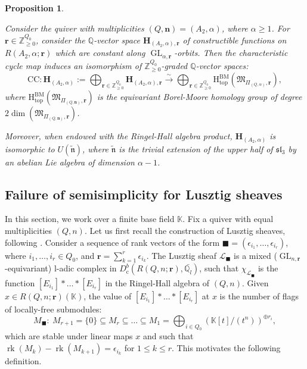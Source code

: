 \documentclass[11pt,english]{article}
\numberwithin{equation}{section}
\numberwithin{figure}{section}
\theoremstyle{definition}
\theoremstyle{plain}
\newtheorem{prop}[df]{Proposition}
\theoremstyle{remark}
\DeclareMathOperator{\GL}{GL}
\DeclareMathOperator{\rk}{rk}
\newcommand\nn{\mathbf{n}}
\newcommand\rr{\mathbf{r}}
\newcommand\HH{\mathrm{H}}
\newcommand\ZZ{\mathbb{Z}}
\newcommand\QQ{\mathbb{Q}}
\newcommand\KK{\mathbb{K}}
\begin{document}
\begin{prop} \label{Prop/Ch5TopCoHA}

Consider the quiver with multiplicities $(Q,\nn)=(A_{2},\alpha)$,
where $\alpha\geq1$. For $\rr\in\ZZ_{\geq0}^{Q_{0}}$, consider the
$\QQ$-vector space $\mathbf{H}_{(A_{2},\alpha),\rr}$ of constructible
functions on $R(A_{2},\alpha;\rr)$ which are constant along $\GL_{\alpha,\rr}$-orbits.
Then the characteristic cycle map induces an isomorphism of $\ZZ_{\geq0}^{Q_{0}}$-graded
$\QQ$-vector spaces:\[
\mathrm{CC}:
\mathbf{H}_{(A_2,\alpha)}:=\bigoplus_{\rr\in\ZZ_{\geq0}^{Q_0}}\mathbf{H}_{(A_2,\alpha),\rr}
\overset{\sim}{\longrightarrow}
\bigoplus_{\rr\in\ZZ_{\geq0}^{Q_0}}\HH_{\mathrm{top}}^{\mathrm{BM}}\left(\mathfrak{M}_{\Pi_{(Q,\alpha)},\rr}\right)
,
\]where $\HH_{\mathrm{top}}^{\mathrm{BM}}\left(\mathfrak{M}_{\Pi_{(Q,\nn)},\rr}\right)$
is the equivariant Borel-Moore homology group of degree $2\dim\left(\mathfrak{M}_{\Pi_{(Q,\nn)},\rr}\right)$.

Moreover, when endowed with the Ringel-Hall algebra product, $\mathbf{H}_{(A_{2},\alpha)}$
is isomorphic to $U(\tilde{\mathfrak{n}})$, where $\tilde{\mathfrak{n}}$
is the trivial extension of the upper half of $\mathfrak{sl}_{3}$
by an abelian Lie algebra of dimension $\alpha-1$.

\end{prop}

\subsection{Failure of semisimplicity for Lusztig sheaves}

In this section, we work over a finite base field $\KK$. Fix a quiver
with equal multiplicities $(Q,n)$. Let us first recall the construction
of Lusztig sheaves, following \cite{Lus91,Fan14}. Consider a sequence
of rank vectors of the form $\blacksquare=(\epsilon_{i_{1}},\ldots,\epsilon_{i_{r}})$,
where $i_{1},\ldots,i_{r}\in Q_{0}$, and $\rr=\sum_{k=1}^{r}\epsilon_{i_{k}}$.
The Lusztig sheaf $\mathcal{L}_{\blacksquare}$ is a mixed ($\GL_{n,\rr}$-equivariant)
l-adic complex in $D_{\mathrm{c}}^{b}(R(Q,n;\rr),\bar{\QQ_{l}})$,
such that $\chi_{\mathcal{L}_{\blacksquare}}$ is the function $[E_{i_{1}}]*\ldots*[E_{i_{r}}]$
in the Ringel-Hall algebra of $(Q,n)$. Given $x\in R(Q,n;\rr)(\KK)$,
the value of $[E_{i_{1}}]*\ldots*[E_{i_{r}}]$ at $x$ is the number
of flags of locally-free submodules:\[
M_{\blacksquare}:\ M_{r+1}=\{0\}\subseteq M_r\subseteq\ldots\subseteq M_1=\bigoplus_{i\in Q_0}\left( \KK[t]/(t^n)\right)^{\oplus r_i},
\]which are stable under linear maps $x$ and such that $\rk(M_{k})-\rk(M_{k+1})=\epsilon_{i_{k}}$
for $1\leq k\leq r$. This motivates the following definition.
\end{document}
